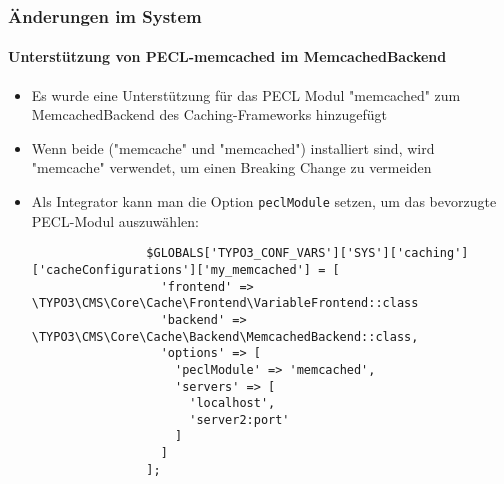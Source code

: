 \begin{frame}[fragile]
	\frametitle{Änderungen im System}
	\framesubtitle{Unterstützung von PECL-memcached im MemcachedBackend}

	\lstset{basicstyle=\tiny\ttfamily}

	\begin{itemize}

		\item Es wurde eine Unterstützung für das PECL Modul "memcached" zum MemcachedBackend des Caching-Frameworks hinzugefügt

		\item Wenn beide ("memcache" und "memcached") installiert sind, wird "memcache"
			verwendet, um einen Breaking Change zu vermeiden

		\item Als Integrator kann man die Option \texttt{peclModule} setzen, um das bevorzugte PECL-Modul auszuwählen:

			\begin{lstlisting}
				$GLOBALS['TYPO3_CONF_VARS']['SYS']['caching']['cacheConfigurations']['my_memcached'] = [
				  'frontend' => \TYPO3\CMS\Core\Cache\Frontend\VariableFrontend::class
				  'backend' => \TYPO3\CMS\Core\Cache\Backend\MemcachedBackend::class,
				  'options' => [
				    'peclModule' => 'memcached',
				    'servers' => [
				      'localhost',
				      'server2:port'
				    ]
				  ]
				];
			\end{lstlisting}

	\end{itemize}

\end{frame}


